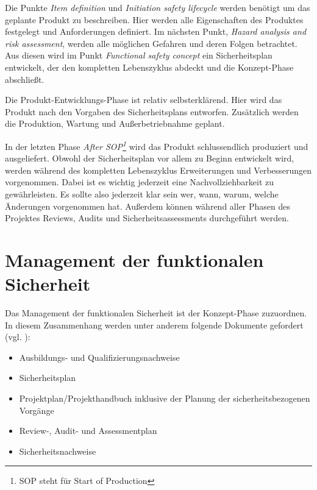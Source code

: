 \documentclass[a4paper,DIV=calc,ngerman]{scrartcl}
\begin{document}
Die Punkte \emph{Item definition} und \emph{Initiation safety lifecycle} werden benötigt um das geplante Produkt zu beschreiben. Hier werden alle Eigenschaften des Produktes festgelegt und Anforderungen definiert. Im nächsten Punkt, \emph{Hazard analysis and risk assessment}, werden alle möglichen Gefahren und deren Folgen betrachtet. Aus diesen wird im Punkt \emph{Functional safety concept} ein Sicherheitsplan entwickelt, der den kompletten Lebenszyklus abdeckt und die Konzept-Phase abschließt. 

Die Produkt-Entwicklungs-Phase ist relativ selbsterklärend. Hier wird das Produkt nach den Vorgaben des Sicherheitsplans entworfen. Zusätzlich werden die Produktion, Wartung und Außerbetriebnahme geplant.

In der letzten Phase \emph{After SOP\footnote{SOP steht für Start of Production}} wird das Produkt schlussendlich produziert und ausgeliefert. Obwohl der Sicherheitsplan vor allem zu Beginn entwickelt wird, werden während des kompletten Lebenszyklus Erweiterungen und Verbesserungen vorgenommen. Dabei ist es wichtig jederzeit eine Nachvollziehbarkeit zu gewährleisten. Es sollte also jederzeit klar sein wer, wann, warum, welche Änderungen vorgenommen hat. Außerdem können während aller Phasen des Projektes Reviews, Audits und Sicherheitsassessments durchgeführt werden. \cite[S. 121]{1}





\section{Management der funktionalen Sicherheit}
\label{sec:Management}
Das Management der funktionalen Sicherheit ist der Konzept-Phase zuzuordnen. In diesem Zusammenhang werden unter anderem folgende Dokumente gefordert (vgl. \cite[S. 121]{1}):

\begin{itemize}
    \item Ausbildungs- und Qualifizierungsnachweise
    \item Sicherheitsplan
    \item Projektplan/Projekthandbuch inklusive der Planung der sicherheitsbezogenen Vorgänge
    \item Review-, Audit- und Assessmentplan
    \item Sicherheitsnachweise
\end{itemize}
\end{document}
